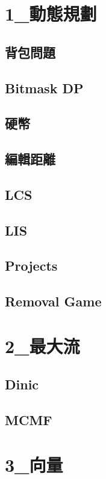 \section{1_動態規劃}
\subsection{背包問題} 

\subsection{Bitmask DP} 

\subsection{硬幣} 

\subsection{編輯距離} 

\subsection{LCS} 

\subsection{LIS} 

\subsection{Projects} 

\subsection{Removal Game} 


\section{2_最大流}
\subsection{Dinic} 

\subsection{MCMF} 


\section{3_向量}
